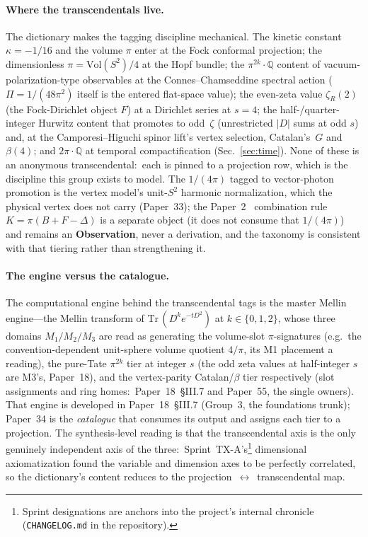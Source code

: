 \documentclass[aps,pra,twocolumn,superscriptaddress,longbibliography,nofootinbib]{revtex4-2}
\newcommand{\gvc}[2]{#2}
\begin{document}
\paragraph{Where the transcendentals live.}
The dictionary makes the tagging discipline mechanical.  The kinetic
constant $\kappa=-1/16$ and the volume $\pi$ enter at the Fock conformal
projection; the dimensionless $\pi=\mathrm{Vol}(S^2)/4$ at the Hopf
bundle; the $\pi^{2k}\cdot\mathbb{Q}$ content of vacuum-polarization-type
observables at the Connes--Chamseddine spectral action ($\Pi=1/(48\pi^2)$
itself is the entered flat-space value); the even-zeta value $\zeta_R(2)$ (the Fock-Dirichlet object $F$)
at a Dirichlet series at $s=4$; the half-/quarter-integer Hurwitz content that
promotes to odd~$\zeta$ (unrestricted $|D|$ sums at odd $s$) and, at the
Camporesi--Higuchi spinor lift's vertex selection, Catalan's~$G$ and $\beta(4)$; and $2\pi\cdot\mathbb{Q}$
at temporal compactification (Sec.~\ref{sec:time}).  None of these is an
anonymous transcendental:\ each is pinned to a projection row, which is
the discipline this group exists to model.  The $1/(4\pi)$ tagged to
vector-photon promotion is the vertex model's unit-$S^2$ harmonic
normalization, which the physical vertex does not carry (Paper~33); the Paper~2~\cite{loutey_paper2} \gvc{k-combination-rule}{combination rule
$K = \pi(B+F-\Delta)$ is a separate object (it does not consume that $1/(4\pi)$) and
remains an \textbf{Observation}, never a derivation}, and the taxonomy is consistent
with that tiering rather than strengthening it.

\paragraph{The engine versus the catalogue.}
The computational engine behind the transcendental tags is the master
Mellin engine---the Mellin transform of $\mathrm{Tr}\,(D^k e^{-tD^2})$ at
$k\in\{0,1,2\}$, whose three domains $M_1/M_2/M_3$ are read as
generating the volume-slot $\pi$-signatures (e.g.\ the convention-dependent unit-sphere volume quotient $4/\pi$, its M1 placement a reading), the pure-Tate $\pi^{2k}$ tier at integer $s$ (the odd zeta values at half-integer $s$ are M3's, Paper~18), and the
vertex-parity Catalan/$\beta$ tier respectively (slot assignments and ring homes:\ Paper~18~\S III.7 and Paper~55, the single owners).  That engine is
developed in Paper~18~\S III.7 (Group~3, the foundations trunk); Paper~34
is the \emph{catalogue} that consumes its output and assigns each tier to
a projection.  The synthesis-level reading is that the transcendental
axis is the only genuinely independent axis of the three:\
Sprint~TX-A's\footnote{Sprint designations are anchors into the
project's internal chronicle (\texttt{CHANGELOG.md} in the
repository).}
dimensional axiomatization found the variable and dimension axes to be
perfectly correlated, so the dictionary's content reduces to the
projection~$\leftrightarrow$~transcendental map.
\end{document}
